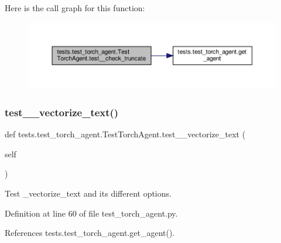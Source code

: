 Here is the call graph for this function\+:
\nopagebreak
\begin{figure}[H]
\begin{center}
\leavevmode
\includegraphics[width=350pt]{classtests_1_1test__torch__agent_1_1TestTorchAgent_ab5ef383cb36b970850bb3e171c832f36_cgraph}
\end{center}
\end{figure}
\mbox{\label{classtests_1_1test__torch__agent_1_1TestTorchAgent_a9bce672782a5d1408c104fd89d2d403f}} 
\subsubsection{\texorpdfstring{test\+\_\+\+\_\+vectorize\+\_\+text()}{test\_\_vectorize\_text()}}
{\footnotesize\ttfamily def tests.\+test\+\_\+torch\+\_\+agent.\+Test\+Torch\+Agent.\+test\+\_\+\+\_\+vectorize\+\_\+text (\begin{DoxyParamCaption}\item[{}]{self }\end{DoxyParamCaption})}

\begin{DoxyVerb}Test _vectorize_text and its different options.\end{DoxyVerb}
 

Definition at line 60 of file test\+\_\+torch\+\_\+agent.\+py.



References tests.\+test\+\_\+torch\+\_\+agent.\+get\+\_\+agent().

